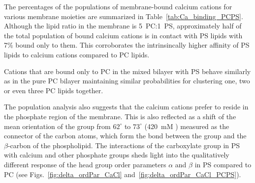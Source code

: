 The percentages of the populations of membrane-bound calcium cations for various membrane moieties 
are summarized in Table~\ref{tab:Ca_binding_PCPS}.
Although the lipid ratio in the membrane is 5~PC:1~PS,
approximately half of the total population of bound calcium cations is in contact with PS lipids
with 7\% bound only to them. 
This corroborates the intrinsincally higher affinity of PS lipids to calcium cations compared to PC lipids. 

Cations that are bound only to PC in the mixed bilayer with PS 
behave similarly as in the pure PC bilayer
maintaining similar probabilities for clustering one, two or even three PC lipids together. 

The population analysis also suggests 
that the calcium cations prefer to reside in the phosphate region of the membrane. 
This is also reflected as a shift of the mean orientation of the  group from $62^\circ$ to $73^\circ$ (420~mM )
measured as the connector of the carbon atoms, which form the bond between the group and the $\beta$-carbon of the phospholipid. 
The interactions of the carboxylate group in PS with calcium and other phosphate groups
sheds light into the qualitatively different response of the head group order parameters $\alpha$ and $\beta$ in PS compared to PC 
(see Figs.~\ref{fig:delta_ordPar_CaCl} and~\ref{fig:delta_ordPar_CaCl_PCPS}). 



